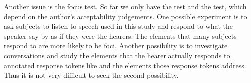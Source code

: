 Another issue is the focus test.
So far we only have the  test and the  test,
which depend on the author's acceptability judgements.
One possible experiment is to ask subjects to listen to speech used in this study
and respond to what the speaker say by 
as if they were the hearers.
The elements that many subjects respond to are more likely to be foci.
Another possibility is to investigate conversations and study the elements that the hearer actually responds to.
 annotated response tokens like  and the elements those response tokens address.
Thus it is not very difficult to seek the second possibility.


